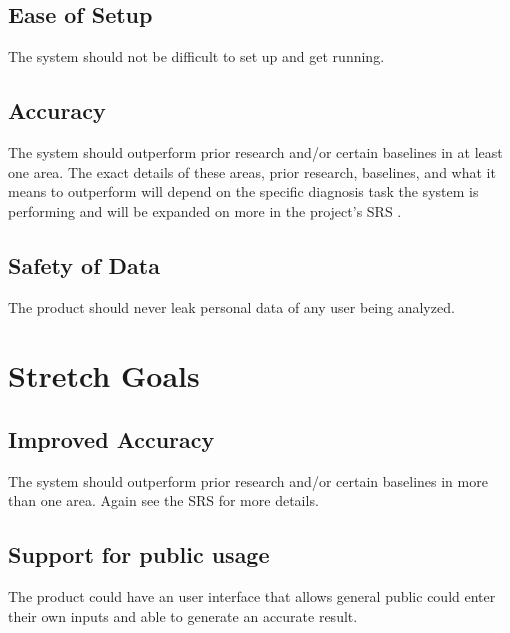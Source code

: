 \documentclass{article}
\begin{document}
\subsection{Ease of Setup}
The system should not be difficult to set up and get running.

\subsection{Accuracy}
The system should outperform prior research and/or certain baselines in at least one area. The exact details of these areas, prior research, baselines, and what it means to outperform will depend on the specific diagnosis task the system is performing and will be expanded on more in the project's SRS \citep{CogCareCrewSRS}.

\subsection{Safety of Data}
The product should never leak personal data of any user being analyzed.

\section{Stretch Goals}

\subsection{Improved Accuracy}
The system should outperform prior research and/or certain baselines in more than one area. Again see the SRS \citep{CogCareCrewSRS} for more details.

\subsection{Support for public usage}
The product could have an user interface that allows general public could enter their own inputs and able to generate an accurate result.




\end{document}
